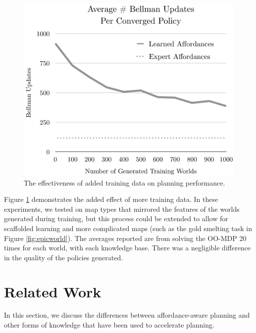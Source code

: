\documentclass[conference]{IEEEtran}
\begin{document}
\begin{figure}[b]
\centering
\includegraphics[scale=0.195]{figures/training_results.png}%
  \caption{The effectiveness of added training data on planning performance.}
  \label{fig:training_results}
\end{figure}

Figure \ref{fig:training_results} demonstrates the added effect of more training data. In these experiments, we tested on map types that mirrored the features of the worlds generated during training, but this process could be extended to allow for scaffolded learning and more complicated maps (such as the gold smelting task in Figure \ref{fig:epicworld}). The averages reported are from solving the OO-MDP 20 times for each world, with each knowledge base. There was a negligible difference in the quality of the policies generated.


\section{Related Work}
\label{sec:related-work}

In this section, we discuss the differences between
affordance-aware planning and other forms of knowledge that
have been used to accelerate planning.

\end{document}
